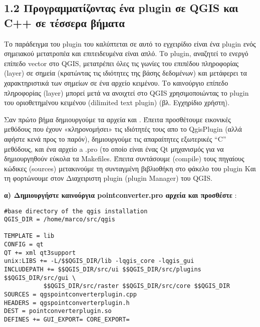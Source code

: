 \subsection{1.2 Προγραμματίζοντας ένα plugin σε QGIS και C++ σε τέσσερα βήματα}

Το παράδειγμα του plugin του καλύπτεται σε αυτό το εγχειρίδιο είναι ένα plugin ενός σημειακού μετατροπέα και επιτειδευμένα είναι απλό. Το plugin, αναζητεί το ενεργό επίπεδο vector στο QGIS,   μετατρέπει όλες τις γωνίες του επιπέδου πληροφορίας (layer) σε σημεία (κρατώντας τις ιδιότητες της βάσης δεδομένων) και μετάφερει τα χαρακτηριστικά των σημείων σε ένα αρχείο κειμένου. Το καινούργιο επίπεδο πληροφορίας (layer) μπορεί μετά να ανοιχτεί στο QGIS χρησιμοποιώντας το plugin του οριοθετημένου κειμένου (dilimited text plugin) (βλ. Εγχηρίδιο χρήστη).


Σαν πρώτο βήμα δημιουργούμε τα αρχεία  και
. Έπειτα προσθέτουμε εικονικές μεθόδους  που έχουν «κληρονομήσει» τις ιδιότητές τους απο το QgisPlugin (αλλά αφήστε κενά προς το παρόν), δημιουργούμε τις απαραίτητες εξωτερικές “C” μεθόδους, και ένα αρχείο a .pro (το οποίο είναι ένας Qt μηχανισμός για να δημιουργηθούν εύκολα τα Makefiles. Έπειτα συντάσουμε (compile) τους πηγαίους κώδικες (sources) μετακινούμε τη συνταγμένη βιβλιοθήκη στο φάκελο του plugin Και τη φορτώνουμε στον Διαχειριστη plugin (plugin Manager) του QGIS.

\textbf{α) Δημιουργήστε καινούργια pointconverter.pro αρχεία και προσθέστε }:


% 
%
%
%


\begin{verbatim}
#base directory of the qgis installation
QGIS_DIR = /home/marco/src/qgis

TEMPLATE = lib
CONFIG = qt
QT += xml qt3support
unix:LIBS += -L/$$QGIS_DIR/lib -lqgis_core -lqgis_gui
INCLUDEPATH += $$QGIS_DIR/src/ui $$QGIS_DIR/src/plugins  $$QGIS_DIR/src/gui \
	       $$QGIS_DIR/src/raster $$QGIS_DIR/src/core $$QGIS_DIR 
SOURCES = qgspointconverterplugin.cpp
HEADERS = qgspointconverterplugin.h
DEST = pointconverterplugin.so
DEFINES += GUI_EXPORT= CORE_EXPORT=
\end{verbatim}

